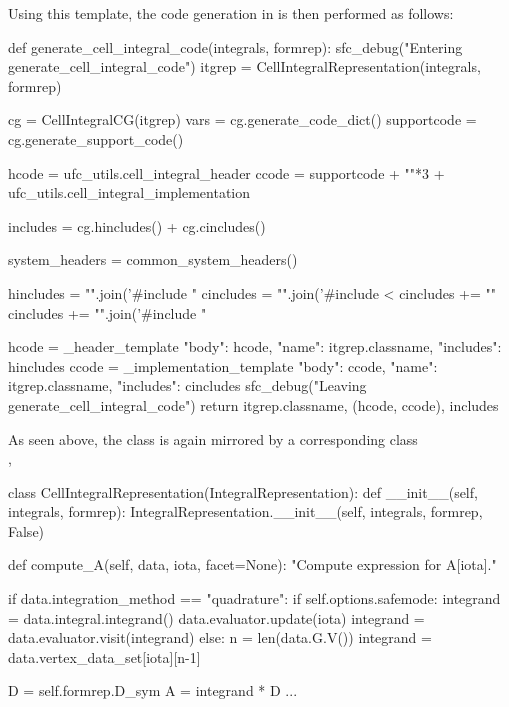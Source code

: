 \noindent Using this template, the code generation in \sfc{} is then performed
as follows:
\begin{python}
def generate_cell_integral_code(integrals, formrep):
    sfc_debug("Entering generate_cell_integral_code")
    itgrep = CellIntegralRepresentation(integrals, formrep)

    cg = CellIntegralCG(itgrep)
    vars = cg.generate_code_dict()
    supportcode = cg.generate_support_code()

    hcode = ufc_utils.cell_integral_header %
    ccode = supportcode + "\n"*3 + ufc_utils.cell_integral_implementation %

    includes = cg.hincludes() + cg.cincludes()

    system_headers = common_system_headers()

    hincludes = "\n".join('#include "%
    cincludes =  "\n".join('#include <%
    cincludes += "\n"
    cincludes += "\n".join('#include "%

    hcode = _header_template         %
             { "body": hcode, "name": itgrep.classname, "includes": hincludes }
    ccode = _implementation_template %
             { "body": ccode, "name": itgrep.classname, "includes": cincludes }
    sfc_debug("Leaving generate_cell_integral_code")
    return itgrep.classname, (hcode, ccode), includes
\end{python}
As seen above, the  class is again mirrored by a
corresponding class \\
,
\begin{python}
class CellIntegralRepresentation(IntegralRepresentation):
    def __init__(self, integrals, formrep):
        IntegralRepresentation.__init__(self, integrals, formrep, False)

    def compute_A(self, data, iota, facet=None):
        "Compute expression for A[iota]."

        if data.integration_method == "quadrature":
            if self.options.safemode:
                integrand = data.integral.integrand()
                data.evaluator.update(iota)
                integrand = data.evaluator.visit(integrand)
            else:
                n = len(data.G.V())
                integrand = data.vertex_data_set[iota][n-1]

            D = self.formrep.D_sym
            A = integrand * D
            ...
\end{python}
